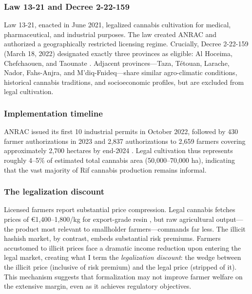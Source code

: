 \documentclass[12pt]{article}
\begin{document}
\subsubsection*{Law 13-21 and Decree 2-22-159} Law 13-21, enacted in June 2021, legalized cannabis cultivation for medical, pharmaceutical, and industrial purposes. The law created ANRAC and authorized a geographically restricted licensing regime. Crucially, Decree 2-22-159 (March 18, 2022) designated exactly three provinces as eligible: Al Hoceima, Chefchaouen, and Taounate \citep{JIED2024}. Adjacent provinces---Taza, T\'{e}touan, Larache, Nador, Fahs-Anjra, and M'diq-Fnideq---share similar agro-climatic conditions, historical cannabis traditions, and socioeconomic profiles, but are excluded from legal cultivation.

\subsubsection*{Implementation timeline} ANRAC issued its first 10 industrial permits in October 2022, followed by 430 farmer authorizations in 2023 and 2,837 authorizations to 2,659 farmers covering approximately 2,700 hectares by end-2024 \citep{GlobalInitiative2024}. Legal cultivation thus represents roughly 4--5\% of estimated total cannabis area (50,000--70,000 ha), indicating that the vast majority of Rif cannabis production remains informal.

\subsubsection*{The legalization discount} Licensed farmers report substantial price compression. Legal cannabis fetches prices of \euro{}1,400--1,800/kg for export-grade resin \citep{MoroccaWorld2025}, but raw agricultural output---the product most relevant to smallholder farmers---commands far less. The illicit hashish market, by contrast, embeds substantial risk premiums. Farmers accustomed to illicit prices face a dramatic income reduction upon entering the legal market, creating what I term the \textit{legalization discount}: the wedge between the illicit price (inclusive of risk premium) and the legal price (stripped of it). This mechanism suggests that formalization may not improve farmer welfare on the extensive margin, even as it achieves regulatory objectives.
\end{document}
